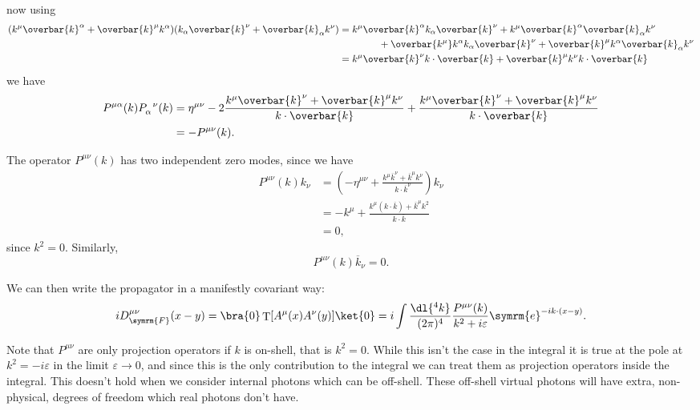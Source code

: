 \documentclass[fleqn]{NotesClass}
\newcommand{\minkowskiMetric}{\eta}
\newcommand{\e}{\symrm{e}}
\DeclareMathOperator{\timeOrdering}{T}
\newcommand{\feynman}{\symrm{F}}
\begin{document}
    now using
    \begin{align}
        (k^\mu \overbar{k}^\alpha + \overbar{k}^\mu k^\alpha)(k_\alpha \overbar{k}^\nu + \overbar{k}_\alpha k^\nu) &= k^\mu \overbar{k}^\alpha k_\alpha \overbar{k}^\nu + k^\mu \overbar{k}^\alpha \overbar{k}_\alpha k^\nu \notag\\
        &\qquad\qquad+ \overbar{k^\mu}k^\alpha k_\alpha \overbar{k}^\nu + \overbar{k}^\mu k^\alpha \overbar{k}_\alpha k^\nu\\
        &= k^\mu\overbar{k}^\nu k\cdot \overbar{k} + \overbar{k}^\mu k^\nu k \cdot \overbar{k}
    \end{align}
    we have
    \begin{align}
        P^{\mu\alpha}(k) \tensor{P}{_\alpha^\nu}(k) &= \minkowskiMetric^{\mu\nu} - 2\frac{k^\mu \overbar{k}^\nu + \overbar{k}^\mu k^\nu}{k \cdot \overbar{k}} + \frac{k^\mu \overbar{k}^\nu + \overbar{k}^\mu k^\nu}{k \cdot \overbar{k}}\\
        &= -P^{\mu\nu}(k).
    \end{align}
    
    The operator \(P^{\mu\nu}(k)\) has two independent zero modes, since we have
    \begin{align}
        P^{\mu\nu}(k)k_\nu &= \left( -\minkowskiMetric^{\mu\nu} + \frac{k^\mu\overbar{k}^\nu + \overbar{k}^\mu k^\nu}{k \cdot \overbar{k}^\nu} \right) k_\nu\\
        &= -k^\mu + \frac{k^\mu(k \cdot \overbar{k}) + \overbar{k}^\mu k^2}{k \cdot \overbar{k}}\\
        &= 0,
    \end{align}
    since \(k^2 = 0\).
    Similarly,
    \begin{equation}
        P^{\mu\nu}(k)\overbar{k}_\nu = 0.
    \end{equation}
    
    We can then write the propagator in a manifestly covariant way:
    \begin{equation}
        iD_{\feynman}^{\mu\nu}(x - y) = \bra{0} \timeOrdering[A^\mu(x)A^\nu(y)]\ket{0} = i \int \frac{\dl{^4k}}{(2\pi)^4} \frac{P^{\mu\nu}(k)}{k^2 + i\varepsilon} \e^{-ik\cdot(x - y)}.
    \end{equation}
    
    Note that \(P^{\mu\nu}\) are only projection operators if \(k\) is on-shell, that is \(k^2 = 0\).
    While this isn't the case in the integral it is true at the pole at \(k^2 = -i\varepsilon\) in the limit \(\varepsilon \to 0\), and since this is the only contribution to the integral we can treat them as projection operators inside the integral.
    This doesn't hold when we consider internal photons which can be off-shell.
    These off-shell virtual photons will have extra, non-physical, degrees of freedom which real photons don't have.
    
\end{document}
